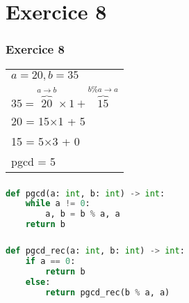 \documentclass[svgnames,11pt]{beamer}
\begin{document}
\section{Exercice 8}
\begin{frame}
    \frametitle{Exercice 8}
    \begin{center}
        \begin{tabular}{l}
    $a=20, b=35$\\
            $35 = \overbrace{20}^{a\rightarrow b}×1 + \overbrace{15}^{b\%a\rightarrow a}$\\
    20 = 15×1 + 5\\
    15 = 5×3 + 0\\
    pgcd = 5
        \end{tabular}
    \end{center}


\end{frame}
\begin{frame}[fragile]
    \frametitle{}

    \begin{center}
        \begin{lstlisting}[language=Python , basicstyle=\ttfamily\small, xleftmargin=2em, xrightmargin=2em]
def pgcd(a: int, b: int) -> int:
    while a != 0:
        a, b = b % a, a
    return b
\end{lstlisting}
        \label{CODE}
        \end{center}

\end{frame}
\begin{frame}[fragile]
    \frametitle{}

    \begin{center}
        \begin{lstlisting}[language=Python , basicstyle=\ttfamily\small, xleftmargin=2em, xrightmargin=2em]
def pgcd_rec(a: int, b: int) -> int:
    if a == 0:
        return b
    else:
        return pgcd_rec(b % a, a)
\end{lstlisting}
        \label{CODE}
        \end{center}

\end{frame}
\end{document}
